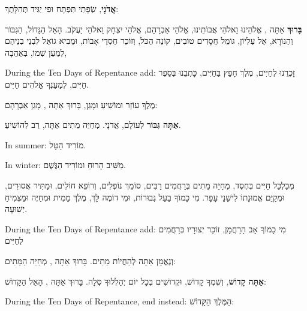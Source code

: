 
\label{arvit-amidah}

\textbf{אֲדֹנָי}, שְׂפָתַי תִּפְתָּח וּפִי יַגִּיד תְּהִלָּתֶךָ:

\textbf{בָּרוּךְ} אַתָּה \Shem{}, אֱלֹהֵינוּ וֵאלֹהֵי אֲבוֹתֵינוּ, אֱלֹהֵי אַבְרָהָם, אֱלֹהֵי יִצְחָק וֵאלֹהֵי יַעֲקֹב. הָאֵל הַגָּדוֹל, הַגִּבּוֹר וְהַנּוֹרָא, אֵל עֶלְיוֹן, גּוֹמֵל חֲסָדִים טוֹבִים, קוֹנֵה הַכֹּל, וְזוֹכֵר חַסְדֵי אָבוֹת, וּמֵבִיא גוֹאֵל לִבְנֵי בְנֵיהֶם לְמַעַן שְׁמוֹ, בְּאַהֲבָה,

\begin{seasonal}{During the Ten Days of Repentance add:}
זָכְרֵנוּ לְחַיִּים, מֶלֶךְ חָפֵץ בַּחַיִּים, כָּתְבֵנוּ בְּסֵפֶר חַיִּים, לְמַעַנְךָ אֱלֹהִים חַיִּים.
\end{seasonal}

מֶלֶךְ עוֹזֵר וּמוֹשִׁיעַ וּמָגֵן, בָּרוּךְ אַתָּה \Shem{}, מָגֵן אַבְרָהָם:

\textbf{אַתָּה גִּבּוֹר} לְעוֹלָם, אֲדֹנָי. מְחַיֵּה מֵתִים אַתָּה, רַב לְהוֹשִׁיעַ.

\begin{seasonal}{In summer:}
מוֹרִיד הַטָּל.
\end{seasonal}

\begin{seasonal}{In winter:}
מַשִּׁיב הָרוּחַ וּמוֹרִיד הַגֶּשֶׁם.
\end{seasonal}

מְכַלְכֵּל חַיִּים בְּחֶסֶד, מְחַיֵּה מֵתִים בְּרַחֲמִים רַבִּים, סוֹמֵךְ נוֹפְלִים, וְרוֹפֵא חוֹלִים, וּמַתִּיר אֲסוּרִים, וּמְקַיֵּם אֱמוּנָתוֹ לִישֵׁנֵי עָפָר. מִי כָמוֹךָ בַעַל גְּבוּרוֹת, וּמִי דוֹמֶה לָּךְ, מֶלֶךְ מֵמִית וּמְחַיֶּה וּמַצְמִיחַ יְשׁוּעָה.

\begin{seasonal}{During the Ten Days of Repentance add:}
מִי כָמוֹךָ אָב הָרַחֲמָן, זוֹכֵר יְצוּרָיו בְּרַחֲמִים לְחַיִּים
\end{seasonal}

וְנֶאֱמָן אַתָּה לְהַחֲיוֹת מֵתִים. בָּרוּךְ אַתָּה \Shem{}, מְחַיֵּה הַמֵּתִים:

\textbf{אַתָּה קָדוֹשׁ}, וְשִׁמְךָ קָדוֹשׁ, וּקְדוֹשִׁים בְּכָל יוֹם יְהַלְלוּךָ סֶּלָה. בָּרוּךְ אַתָּה \Shem{}, הָאֵל הַקָּדוֹשׁ:

\begin{seasonal}{During the Ten Days of Repentance, end instead:}
הַמֶּלֶךְ הַקָּדוֹשׁ:
\end{seasonal}



